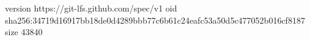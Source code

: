 version https://git-lfs.github.com/spec/v1
oid sha256:34719d16917bb18de0d4289bbb77c6b61c24eafc53a50d5c477052b016cf8187
size 43840
